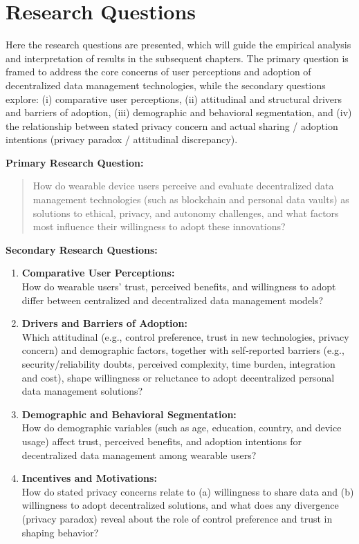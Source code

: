 \section{Research Questions}

Here the research questions are presented, which will guide the empirical analysis and interpretation of results in the subsequent chapters. The primary question is framed to address the core concerns of user perceptions and adoption of decentralized data management technologies, while the secondary questions explore: (i) comparative user perceptions, (ii) attitudinal and structural drivers and barriers of adoption, (iii) demographic and behavioral segmentation, and (iv) the relationship between stated privacy concern and actual sharing / adoption intentions (privacy paradox / attitudinal discrepancy).

\textbf{Primary Research Question:}

\begin{quote}
How do wearable device users perceive and evaluate decentralized data management technologies (such as blockchain and personal data vaults) as solutions to ethical, privacy, and autonomy challenges, and what factors most influence their willingness to adopt these innovations?
\end{quote}

\textbf{Secondary Research Questions:}

\begin{enumerate}
    \item \textbf{Comparative User Perceptions:} \\
    How do wearable users’ trust, perceived benefits, and willingness to adopt differ between centralized and decentralized data management models?
    
    \item \textbf{Drivers and Barriers of Adoption:} \\
	Which attitudinal (e.g., control preference, trust in new technologies, privacy concern) and demographic factors, together with self‑reported barriers (e.g., security/reliability doubts, perceived complexity, time burden, integration and cost), shape willingness or reluctance to adopt decentralized personal data management solutions?
    
    \item \textbf{Demographic and Behavioral Segmentation:} \\
    How do demographic variables (such as age, education, country, and device usage) affect trust, perceived benefits, and adoption intentions for decentralized data management among wearable users?

	\item \textbf{Incentives and Motivations:} \\
	How do stated privacy concerns relate to (a) willingness to share data and (b) willingness to adopt decentralized solutions, and what does any divergence (privacy paradox) reveal about the role of control preference and trust in shaping behavior?
    
\end{enumerate}

